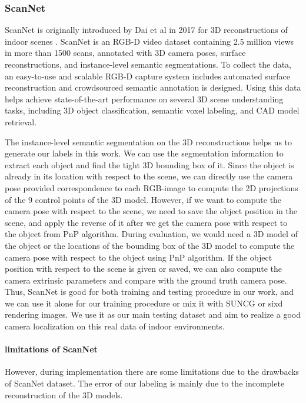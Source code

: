 \subsubsection{ScanNet}
ScanNet is originally introduced by Dai et al in 2017 for 3D reconstructions of indoor scenes \cite{dai2017scannet}. ScanNet is an RGB-D video dataset containing 2.5 million views in more than 1500 scans, annotated with 3D camera poses, surface reconstructions, and instance-level semantic segmentations. To collect the data, an easy-to-use and scalable RGB-D capture system includes automated surface reconstruction and crowdsourced semantic annotation is designed. Using this data helps achieve state-of-the-art performance on several 3D scene understanding tasks, including 3D object classification, semantic voxel labeling, and CAD model retrieval.

The instance-level semantic segmentation on the 3D reconstructions helps us to generate our labels in this work. We can use the segmentation information to extract each object and find the tight 3D bounding box of it. Since the object is already in its location with respect to the scene, we can directly use the camera pose provided correspondence to each RGB-image to compute the 2D projections of the 9 control points of the 3D model. However, if we want to compute the camera pose with respect to the scene, we need to save the object position in the scene, and apply the reverse of it after we get the camera pose with respect to the object from PnP algorithm. During evaluation, we would need a 3D model of the object or the locations of the bounding box of the 3D model to compute the camera pose with respect to the object using PnP algorithm. If the object position with respect to the scene is given or saved, we can also compute the camera extrinsic parameters and compare with the ground truth camera pose. Thus, ScanNet is good for both training and testing procedure in our work, and we can use it alone for our training procedure or mix it with SUNCG or sixd rendering images. We use it  as our main testing dataset and aim to realize a good camera localization on this real data of indoor environments.

\paragraph{limitations of ScanNet}

However, during implementation there are some limitations due to the drawbacks of ScanNet dataset. The error of our labeling is mainly due to the incomplete reconstruction of the 3D models.

